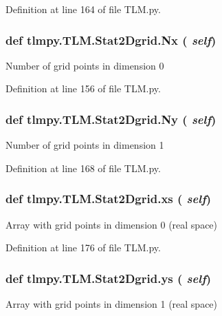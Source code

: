 Definition at line 164 of file TLM.py.\hypertarget{classtlmpy_1_1TLM_1_1Stat2Dgrid_a879cbb77ecf6958afb025a9dcaee4173}{
\subsubsection[{Nx}]{\setlength{\rightskip}{0pt plus 5cm}def tlmpy.TLM.Stat2Dgrid.Nx ( {\em self})}}
\label{classtlmpy_1_1TLM_1_1Stat2Dgrid_a879cbb77ecf6958afb025a9dcaee4173}
\begin{DoxyVerb}Number of grid points in dimension 0\end{DoxyVerb}
 

Definition at line 156 of file TLM.py.\hypertarget{classtlmpy_1_1TLM_1_1Stat2Dgrid_aaa41519aab6e5a9f8695812daf6ce4c0}{
\subsubsection[{Ny}]{\setlength{\rightskip}{0pt plus 5cm}def tlmpy.TLM.Stat2Dgrid.Ny ( {\em self})}}
\label{classtlmpy_1_1TLM_1_1Stat2Dgrid_aaa41519aab6e5a9f8695812daf6ce4c0}
\begin{DoxyVerb}Number of grid points in dimension 1\end{DoxyVerb}
 

Definition at line 168 of file TLM.py.\hypertarget{classtlmpy_1_1TLM_1_1Stat2Dgrid_aec1828bba5b1c39042d3fb670647ae0d}{
\subsubsection[{xs}]{\setlength{\rightskip}{0pt plus 5cm}def tlmpy.TLM.Stat2Dgrid.xs ( {\em self})}}
\label{classtlmpy_1_1TLM_1_1Stat2Dgrid_aec1828bba5b1c39042d3fb670647ae0d}
\begin{DoxyVerb}Array with grid points in dimension 0 (real space)\end{DoxyVerb}
 

Definition at line 176 of file TLM.py.\hypertarget{classtlmpy_1_1TLM_1_1Stat2Dgrid_aa6a0c860a593b944fdc1fdb1f2633b0b}{
\subsubsection[{ys}]{\setlength{\rightskip}{0pt plus 5cm}def tlmpy.TLM.Stat2Dgrid.ys ( {\em self})}}
\label{classtlmpy_1_1TLM_1_1Stat2Dgrid_aa6a0c860a593b944fdc1fdb1f2633b0b}
\begin{DoxyVerb}Array with grid points in dimension 1 (real space)\end{DoxyVerb}
 

